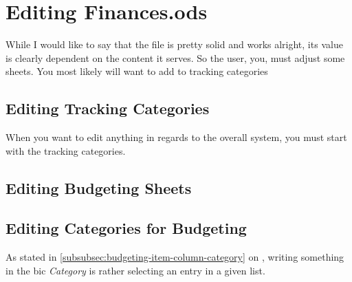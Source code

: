 \section{Editing Finances.ods}
\label{sec:editing-finances.ods}

While I would like to say that the file is pretty solid and works alright, its  value is clearly dependent on the content it serves.
So the user, you, must adjust some sheets.
You most likely will want to add to tracking categories

\subsection{Editing Tracking Categories}
\label{subsec:editing-tracking-categories}

When you want to edit anything in regards to the overall system, you must start with the tracking categories.

\subsection{Editing Budgeting Sheets}
\label{subsec:editing-budgeting-sheets}

\subsection{Editing Categories for Budgeting}
\label{subsec:editing-categories-for-budgeting}

As stated in \autoref{subsubsec:budgeting-item-column-category} on , writing something in the \ac{bic} \emph{Category}  is rather selecting an entry in a given list.